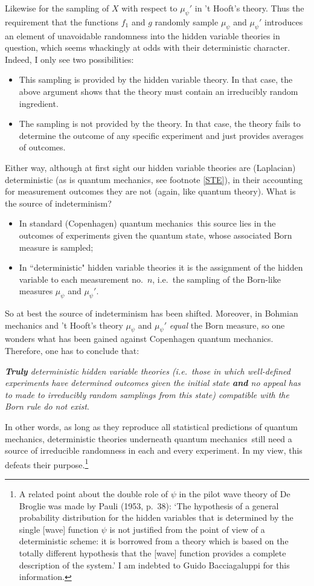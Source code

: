 \documentclass[12pt]{article}
\numberwithin{equation}{section}
\newcommand{\qm}{quantum mechanics}
\begin{document}
Likewise for the sampling of $X$ with respect to $\mu_{\psi}'$ in 't Hooft's theory.
Thus the requirement that the functions $f_1$ and $g$ randomly sample $\mu_{\psi}$ and $\mu_{\psi}'$ 
 introduces an element of unavoidable randomness into the hidden variable theories in question, which seems whackingly at odds with their deterministic character. 
 Indeed, I only see two possibilities:
\begin{itemize}
\item  This sampling is provided by the hidden variable theory. In that case, the above argument shows that the theory must contain an irreducibly random ingredient.
\item  The sampling is not provided by the theory. In that case, the theory fails to determine the outcome of any specific experiment and just provides averages of outcomes.
\end{itemize}
Either way, although at first sight our hidden variable theories are (Laplacian) deterministic (as is quantum mechanics, see footnote \ref{STE}), in their accounting for measurement outcomes they are not (again, like quantum theory). 
What is the source of indeterminism?
\begin{itemize}
\item  In standard (Copenhagen) \qm\  this source lies in the outcomes of experiments given the quantum state, whose associated Born measure is sampled;
\item In ``deterministic" hidden variable theories it is the assignment of the hidden variable to each measurement no.\ $n$, i.e.\ the sampling of the Born-like measures $\mu_{\psi}$ and $\mu_{\psi}'$.
\end{itemize}
So at best the source  of indeterminism has been shifted. Moreover, in Bohmian mechanics and 't Hooft's theory $\mu_{\psi}$ and $\mu_{\psi}'$ 
 \emph{equal} the Born measure, so one wonders what has been gained against Copenhagen \qm.
Therefore, one has to conclude \vspace{5pt} that:

\noindent \emph{\textbf{Truly} deterministic hidden variable theories (i.e.\ those in which well-defined experiments have determined outcomes \emph{given} the initial state \textbf{and} no appeal has to made to irreducibly random samplings  \emph{from} this state) compatible with the Born rule  do not exist}.\vspace{5pt}

\noindent
In other words,  as long as they reproduce all statistical predictions of \qm, deterministic theories underneath \qm\ still need a source of irreducible randomness in each and every experiment.  In my view, this defeats their purpose.\footnote{A related point about the double role of $\psi$ in  the pilot wave theory of De Broglie was made by Pauli  (1953, p.\ 38): `The hypothesis of a general probability distribution for the hidden variables that is determined by the single [wave] function $\psi$ is not justified from the point of view of a deterministic scheme: it is borrowed from a theory which is based on the totally different hypothesis that the [wave] function provides a complete description of the system.'
I am indebted to Guido Bacciagaluppi for this information.}
\end{document}
